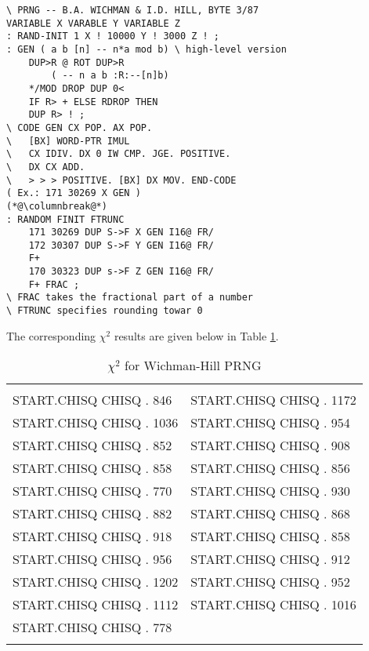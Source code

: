\begin{multicols}{2}
\setlength{\columnsep}{1.5cm}
\setlength{\columnseprule}{0.2pt}
\tiny
\begin{lstlisting}
\ PRNG -- B.A. WICHMAN & I.D. HILL, BYTE 3/87
VARIABLE X VARABLE Y VARIABLE Z
: RAND-INIT 1 X ! 10000 Y ! 3000 Z ! ;
: GEN ( a b [n] -- n*a mod b) \ high-level version
    DUP>R @ ROT DUP>R
        ( -- n a b :R:--[n]b)
    */MOD DROP DUP 0<
    IF R> + ELSE RDROP THEN
    DUP R> ! ;
\ CODE GEN CX POP. AX POP.
\   [BX] WORD-PTR IMUL
\   CX IDIV. DX 0 IW CMP. JGE. POSITIVE.
\   DX CX ADD.
\   > > > POSITIVE. [BX] DX MOV. END-CODE
( Ex.: 171 30269 X GEN )
(*@\columnbreak@*)
: RANDOM FINIT FTRUNC
    171 30269 DUP S->F X GEN I16@ FR/
    172 30307 DUP S->F Y GEN I16@ FR/
    F+
    170 30323 DUP s->F Z GEN I16@ FR/
    F+ FRAC ;
\ FRAC takes the fractional part of a number 
\ FTRUNC specifies rounding towar 0
\end{lstlisting}
\end{multicols}
The corresponding $\chi^2$ results are given below in Table \ref{tbl:03_02}. %


\begin{table}
    \caption{$\chi^2$ for Wichman-Hill PRNG}
    \label{tbl:03_02}
        \setlength{\tabcolsep}{20pt}
        \begin{tabular}{|ll|}
            \hline & \\
            START.CHISQ CHISQ . 846   &  START.CHISQ CHISQ . 1172  \\ 
            START.CHISQ CHISQ . 1036  &  START.CHISQ CHISQ . 954   \\
            START.CHISQ CHISQ . 852   &  START.CHISQ CHISQ . 908   \\
            START.CHISQ CHISQ . 858   &  START.CHISQ CHISQ . 856   \\
            START.CHISQ CHISQ . 770   &  START.CHISQ CHISQ . 930   \\
            START.CHISQ CHISQ . 882   &  START.CHISQ CHISQ . 868   \\
            START.CHISQ CHISQ . 918   &  START.CHISQ CHISQ . 858   \\
            START.CHISQ CHISQ . 956   &  START.CHISQ CHISQ . 912   \\
            START.CHISQ CHISQ . 1202  &  START.CHISQ CHISQ . 952   \\
            START.CHISQ CHISQ . 1112  &  START.CHISQ CHISQ . 1016  \\
            START.CHISQ CHISQ . 778   & \\
            & \\
            \hline
        \end{tabular} 
\end{table}

